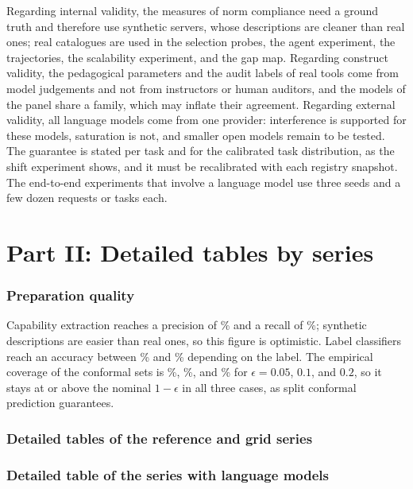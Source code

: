 \documentclass[10pt]{article}
\begin{document}
Regarding internal validity, the measures of norm compliance need a ground truth and therefore use synthetic servers, whose descriptions are cleaner than real ones; real catalogues are used in the selection probes, the agent experiment, the trajectories, the scalability experiment, and the gap map. Regarding construct validity, the pedagogical parameters and the audit labels of real tools come from model judgements and not from instructors or human auditors, and the models of the panel share a family, which may inflate their agreement. Regarding external validity, all language models come from one provider: interference is supported for these models, saturation is not, and smaller open models remain to be tested. The guarantee is stated per task and for the calibrated task distribution, as the shift experiment shows, and it must be recalibrated with each registry snapshot. The end-to-end experiments that involve a language model use three seeds and a few dozen requests or tasks each.


\part*{Part II: Detailed tables by series}
\section{Preparation quality }
Capability extraction reaches a precision of \RCapPrec\% and a recall of \RCapRec\%; synthetic descriptions are easier than real ones, so this figure is optimistic. Label classifiers reach an accuracy between \RLabAccMin\% and \RLabAccMax\% depending on the label. The empirical coverage of the conformal sets is \RConfCovFive\%, \RConfCovTen\%, and \RConfCovTwenty\% for $\epsilon=0.05$, $0.1$, and $0.2$, so it stays at or above the nominal $1-\epsilon$ in all three cases, as split conformal prediction guarantees.


\section{Detailed tables of the reference and grid series}


\section{Detailed table of the series with language models}

\end{document}
